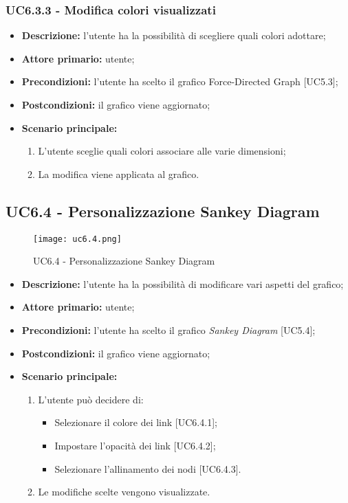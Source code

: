   \subsubsection{UC6.3.3 - Modifica colori visualizzati}
  \begin{itemize}
    \item \textbf{Descrizione:} l'utente ha la possibilità di scegliere quali colori adottare;
    \item \textbf{Attore primario:} utente;
    \item \textbf{Precondizioni:} l’utente ha scelto il grafico Force-Directed Graph [UC5.3];
    \item \textbf{Postcondizioni:} il grafico viene aggiornato;
    \item \textbf{Scenario principale:}
     \begin{enumerate}
      \item L'utente sceglie quali colori associare alle varie dimensioni;
      \item La modifica viene applicata al grafico.
    \end{enumerate}
  \end{itemize}

  \subsection{UC6.4 - Personalizzazione Sankey Diagram}
\begin{figure}[H]
  \centering
  \texttt{[image: uc6.4.png]}
  \caption{UC6.4 - Personalizzazione Sankey Diagram}
\end{figure}
\begin{itemize}
    \item \textbf{Descrizione:} l'utente ha la possibilità di modificare vari aspetti del grafico;
    \item \textbf{Attore primario:} utente;
    \item \textbf{Precondizioni:} l’utente ha scelto il grafico \textit{Sankey Diagram} [UC5.4];
    \item \textbf{Postcondizioni:} il grafico viene aggiornato;
    \item \textbf{Scenario principale:}
    \begin{enumerate}
      \item L'utente può decidere di:
    \begin{itemize}
      \item Selezionare il colore dei link [UC6.4.1];
      \item Impostare l'opacità dei link [UC6.4.2];
      \item Selezionare l'allinamento dei nodi [UC6.4.3].
    \end{itemize}
    \item Le modifiche scelte vengono visualizzate.
  \end{enumerate}
  \end{itemize}

